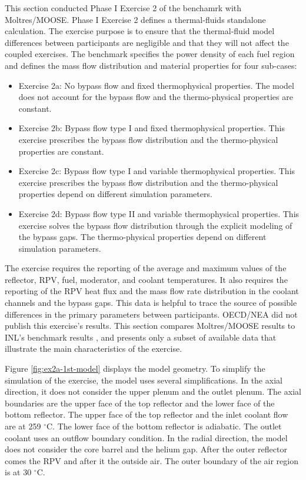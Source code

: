This section conducted Phase I Exercise 2 of the benchamrk with Moltres/MOOSE.
Phase I Exercise 2 defines a thermal-fluids standalone calculation.
The exercise purpose is to ensure that the thermal-fluid model differences between participants are negligible and that they will not affect the coupled exercises.
The benchmark specifies the power density of each fuel region and defines the mass flow distribution and material properties for four sub-cases:
\begin{itemize}
  \item Exercise 2a: No bypass flow and fixed thermophysical properties. The model does not account for the bypass flow and the thermo-physical properties are constant.
  \item Exercise 2b: Bypass flow type I and fixed thermophysical properties. This exercise prescribes the bypass flow distribution and the thermo-physical properties are constant.
  \item Exercise 2c: Bypass flow type I and variable thermophysical properties. This exercise prescribes the bypass flow distribution and the thermo-physical properties depend on different simulation parameters.
  \item Exercise 2d: Bypass flow type II and variable thermophysical properties. This exercise solves the bypass flow distribution through the explicit modeling of the bypass gaps. The thermo-physical properties depend on different simulation parameters.
\end{itemize}

The exercise requires the reporting of the average and maximum values of the reflector, \gls{RPV}, fuel, moderator, and coolant temperatures.
It also requires the reporting of the RPV heat flux and the mass flow rate distribution in the coolant channels and the bypass gaps.
This data is helpful to trace the source of possible differences in the primary parameters between participants.
OECD/NEA did not publish this exercise's results.
This section compares Moltres/MOOSE results to INL's benchmark results \cite{strydom_inl_2013}, and presents only a subset of available data that illustrate the main characteristics of the exercise.

Figure \ref{fig:ex2a-1st-model} displays the model geometry.
To simplify the simulation of the exercise, the model uses several simplifications.
In the axial direction, it does not consider the upper plenum and the outlet plenum.
The axial boundaries are the upper face of the top reflector and the lower face of the bottom reflector.
The upper face of the top reflector and the inlet coolant flow are at 259 $^{\circ}$C.
The lower face of the bottom reflector is adiabatic.
The outlet coolant uses an outflow boundary condition.
In the radial direction, the model does not consider the core barrel and the helium gap.
After the outer reflector comes the RPV and after it the outside air.
The outer boundary of the air region is at 30 $^{\circ}$C.

